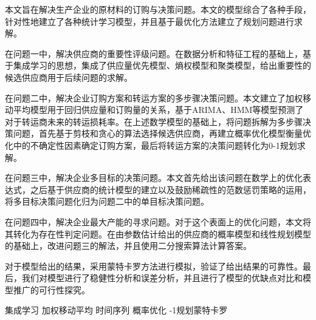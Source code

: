 \documentclass{my_paper}
\begin{document}
\newpage

\begin{center}
\lunwenbiaoti

\vspace{2ex}
\zhaiyao
\end{center}

\iffalse
开头段：需要充分概括论文内容，一般两到三句话即可，长度控制在三至五行。

问题一中，解决了什么问题；应用了什么方法；得到了什么结果。

问题二中，解决了什么问题；应用了什么方法；得到了什么结果。

问题三中，解决了什么问题；应用了什么方法；得到了什么结果。

结尾段：可以总结下全文，也可以介绍下你的论文的亮点，也可以对类似的问题进行适当的推广。
\fi 

本文旨在解决生产企业的原材料的订购与决策问题。本文的模型综合了各种手段，针对性地建立了各种统计学习模型，并且基于最优化方法建立了规划问题进行求解。

在问题一中，解决供应商的重要性评级问题。在数据分析和特征工程的基础上，基于集成学习的思想，集成了供应量优先模型、熵权模型和聚类模型，给出重要性的候选供应商用于后续问题的求解。

在问题二中，解决企业订购方案和转运方案的多步骤决策问题。本文建立了加权移动平均模型用于回归供应量和订购量的关系，基于ARIMA、HMM等模型预测了对于转运商未来的转运损耗率。在上述数学模型的基础上，将问题拆解为多步骤决策问题，首先基于剪枝和贪心的算法选择候选供应商，再建立概率优化模型衡量优化中的不确定性因素确定订购方案，最后将转运方案的决策问题转化为0-1规划求解。

在问题三中，解决企业多目标的决策问题。本文首先给出该问题在数学上的优化表达式，之后基于供应商的统计模型的建立以及鼓励稀疏性的范数惩罚策略的运用，将多目标决策问题化归为问题二中的单目标决策问题。

在问题四中，解决企业最大产能的寻求问题。对于这个表面上的优化问题，本文将其转化为存在性判定问题。在由参数估计给出的供应商的概率模型和线性规划模型的基础上，改进问题三的解法，并且使用二分搜索算法计算答案。

对于模型给出的结果，采用蒙特卡罗方法进行模拟，验证了给出结果的可靠性。最后，我们对模型进行了稳健性分析和误差分析，并且进行了模型的优缺点对比和模型推广的可行性探究。

\begin{guanjianci}
集成学习 \quad 加权移动平均 \quad 时间序列 \quad 概率优化 -1规划\quad 蒙特卡罗
\end{guanjianci}
\end{document}
